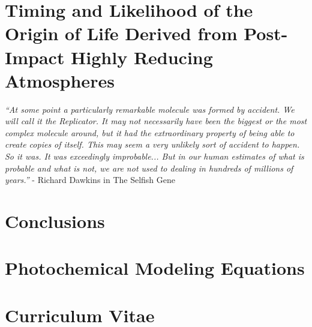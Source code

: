 \documentclass[11pt, proquest]{uwthesis}[2016/11/22]
\begin{document}
\chapter{Timing and Likelihood of the Origin of Life Derived from Post-Impact Highly Reducing Atmospheres} \label{ch:6}
\noindent \emph{``At some point a particularly remarkable molecule was formed by accident. We will call it the Replicator. It may not necessarily have been the biggest or the most complex molecule around, but it had the extraordinary property of being able to create copies of itself. This may seem a very unlikely sort of accident to happen. So it was. It was exceedingly improbable... But in our human estimates of what is probable and what is not, we are not used to dealing in hundreds of millions of years.''} - Richard Dawkins in The Selfish Gene
\newpage


\chapter{Conclusions}
\newpage


\printendnotes

%
%


%
%
\appendix
\raggedbottom\sloppy
 
 
\chapter{Photochemical Modeling Equations}
\newpage


\chapter{Curriculum Vitae}
\newpage

 
\end{document}
